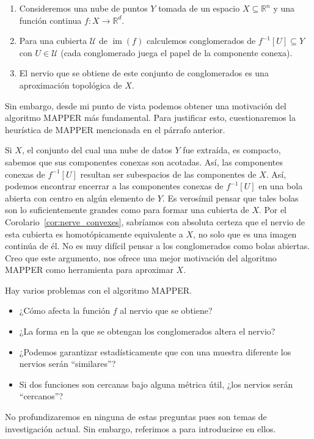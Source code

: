 \documentclass{standalone}
\begin{document}
	\begin{enumerate}
		\item Consideremos una nube de puntos $Y$ tomada de un espacio $X\subseteq\mathbb{R}^{n}$ y una función continua $f\colon X\rightarrow\mathbb{R}^{d}$.
		\item Para una cubierta $\mathcal{U}$ de $\operatorname{im}(f)$ calculemos conglomerados de $f^{-1}[U]\subseteq Y$ con $U\in\mathcal{U}$ (cada conglomerado juega el papel de la componente conexa).
		\item El nervio que se obtiene de este conjunto de conglomerados es una aproximación topológica de $X$.
	\end{enumerate}
	
	Sin embargo, desde mi punto de vista podemos obtener una motivación del algoritmo MAPPER más fundamental. Para justificar esto, cuestionaremos la heurística de MAPPER mencionada en el párrafo anterior.
	
	Si $X$, el conjunto del cual una nube de datos $Y$ fue extraída, es compacto, sabemos que sus componentes conexas son acotadas. Así, las componentes conexas de $f^{-1}[U]$ resultan ser subespacios de las componentes de $X$. Así, podemos encontrar encerrar a las componentes conexas de $f^{-1}[U]$ en una bola abierta con centro en algún elemento de $Y$. Es verosímil pensar que tales bolas son lo suficientemente grandes como para formar una cubierta de $X$. Por el Corolario~\ref{cor:nerve_convexes}, sabríamos con absoluta certeza que el nervio de esta cubierta es homotópicamente equivalente a $X$, no solo que es una imagen continúa de él. No es muy difícil pensar a los conglomerados como bolas abiertas. Creo que este argumento, nos ofrece una mejor motivación del algoritmo MAPPER como herramienta para aproximar $X$.
	
	Hay varios problemas con el algoritmo MAPPER.
	
	\begin{itemize}
		\item ¿Cómo afecta la función $f$ al nervio que se obtiene?
		\item ¿La forma en la que se obtengan los conglomerados altera el nervio?
		\item ¿Podemos garantizar estadísticamente que con una muestra diferente los nervios serán ``similares''?
		\item Si dos funciones son cercanas bajo alguna métrica útil, ¿los nervios serán ``cercanos''?
	\end{itemize}
	
	No profundizaremos en ninguna de estas preguntas pues son temas de investigación actual. Sin embargo, referimos a \cite{chazal:frontiers, carriere:mapper} para introducirse en ellos.
\end{document}
